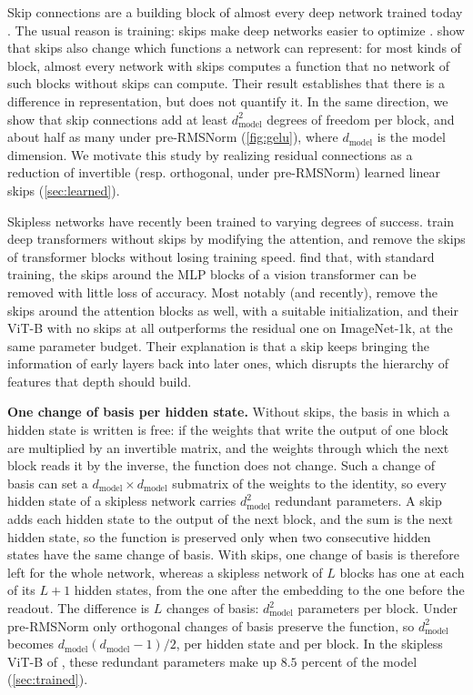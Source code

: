 \documentclass[10pt]{article}
\theoremstyle{definition}
\theoremstyle{remark}
\newcommand{\dm}{d_{\mathrm{model}}}
\newcommand{\para}[1]{\smallskip\noindent\textbf{#1}\hspace{0.5em}}
\begin{document}
Skip connections are a building block of almost every deep network trained today \citep{he2016resnet}. The usual reason is training: skips make deep networks easier to optimize \citep{he2016resnet,balduzzi2017shattered,orhan2018skip}. \citet{mijoski2026worth} show that skips also change which functions a network can represent: for most kinds of block, almost every network with skips computes a function that no network of such blocks without skips can compute. Their result establishes that there is a difference in representation, but does not quantify it. In the same direction, we show that skip connections add at least $\dm^2$ degrees of freedom per block, and about half as many under pre-RMSNorm (\cref{fig:gelu}), where $\dm$ is the model dimension. We motivate this study by realizing residual connections as a reduction of invertible (resp. orthogonal, under pre-RMSNorm) learned linear skips (\cref{sec:learned}).

Skipless networks have recently been trained to varying degrees of success. \citet{he2023shortcuts} train deep transformers without skips by modifying the attention, and \citet{he2024simplifying} remove the skips of transformer blocks without losing training speed. \citet{ji2025always} find that, with standard training, the skips around the MLP blocks of a vision transformer can be removed with little loss of accuracy. Most notably (and recently), \citet{ji2026cutting} remove the skips around the attention blocks as well, with a suitable initialization, and their ViT-B with no skips at all outperforms the residual one on ImageNet-1k, at the same parameter budget. Their explanation is that a skip keeps bringing the information of early layers back into later ones, which disrupts the hierarchy of features that depth should build.

\para{One change of basis per hidden state.} Without skips, the basis in which a hidden state is written is free: if the weights that write the output of one block are multiplied by an invertible matrix, and the weights through which the next block reads it by the inverse, the function does not change. Such a change of basis can set a $\dm\times\dm$ submatrix of the weights to the identity, so every hidden state of a skipless network carries $\dm^2$ redundant parameters. A skip adds each hidden state to the output of the next block, and the sum is the next hidden state, so the function is preserved only when two consecutive hidden states have the same change of basis. With skips, one change of basis is therefore left for the whole network, whereas a skipless network of $L$ blocks has one at each of its $L+1$ hidden states, from the one after the embedding to the one before the readout. The difference is $L$ changes of basis: $\dm^2$ parameters per block. Under pre-RMSNorm only orthogonal changes of basis preserve the function, so $\dm^2$ becomes $\dm(\dm-1)/2$, per hidden state and per block. In the skipless ViT-B of \citet{ji2026cutting}, these redundant parameters make up $8.5$ percent of the model (\cref{sec:trained}).
\end{document}
